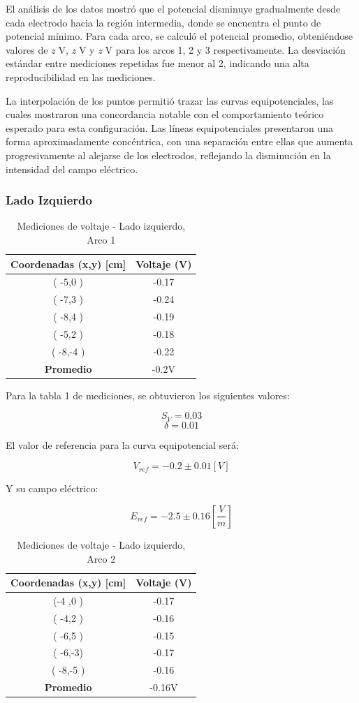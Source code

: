 \documentclass[11pt,twocolumn]{article}
\begin{document}
El análisis de los datos mostró que el potencial disminuye gradualmente desde cada electrodo hacia la región intermedia, donde se encuentra el punto de potencial mínimo. Para cada arco, se calculó el potencial promedio, obteniéndose valores de \textit{z} V, \textit{z} V y \textit{z} V para los arcos 1, 2 y 3 respectivamente. La desviación estándar entre mediciones repetidas fue menor al 2, indicando una alta reproducibilidad en las mediciones.

La interpolación de los puntos permitió trazar las curvas equipotenciales, las cuales mostraron una concordancia notable con el comportamiento teórico esperado para esta configuración. Las líneas equipotenciales presentaron una forma aproximadamente concéntrica, con una separación entre ellas que aumenta progresivamente al alejarse de los electrodos, reflejando la disminución en la intensidad del campo eléctrico.

\subsubsection*{Lado Izquierdo}
\begin{table}[h]

\centering
\caption{Mediciones de voltaje - Lado izquierdo, Arco 1}
\begin{tabular}{cc}
\toprule
\textbf{Coordenadas (x,y) [cm]} & \textbf{Voltaje (V)} \\
\midrule
( -5,0 ) &  -0.17\\
( -7,3 ) &  -0.24\\
( -8,4 ) &  -0.19\\
( -5,2 ) &  -0.18\\
( -8,-4 ) & -0.22 \\
\midrule
\textbf{Promedio} & -0.2V \\
\bottomrule
\end{tabular}
\end{table}

Para la tabla 1 de mediciones, se obtuvieron los siguientes valores:

\[S_V = 0.03\]
\[\delta = 0.01\]

El valor de referencia para la curva equipotencial será:

\[V_{ref} = -0.2 \pm 0.01 [V]\]

Y su campo eléctrico:

\[E_{ref} = -2.5 \pm 0.16 [\frac{V}{m}]\]

\begin{table}[h]
\centering
\caption{Mediciones de voltaje - Lado izquierdo, Arco 2}
\begin{tabular}{cc}
\toprule
\textbf{Coordenadas (x,y) [cm]} & \textbf{Voltaje (V)} \\
\midrule
(-4 ,0 ) &  -0.17\\
( -4,2 ) &  -0.16\\
( -6,5 ) &  -0.15\\
( -6,-3) &  -0.17\\
( -8,-5 ) & -0.16 \\
\midrule
\textbf{Promedio} &  -0.16V\\
\bottomrule
\end{tabular}
\end{table}
\end{document}
